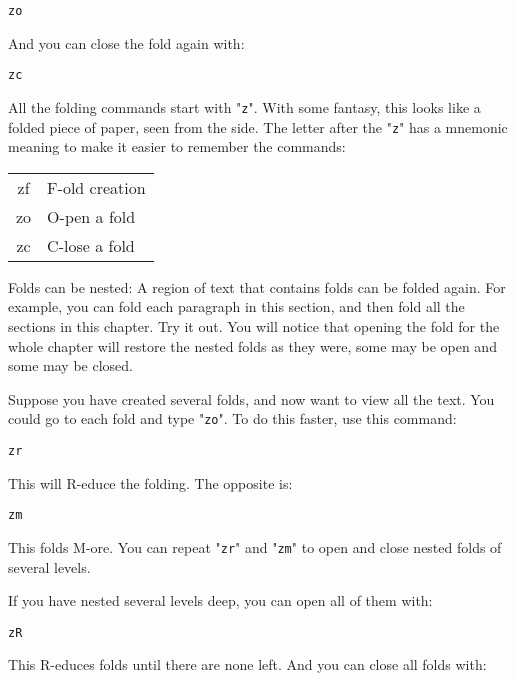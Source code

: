 \begin{Verbatim}[samepage=true]
 zo
\end{Verbatim}

And you can close the fold again with:

\begin{Verbatim}[samepage=true]
 zc
\end{Verbatim}

All the folding commands start with "\texttt{z}".
With some fantasy, this looks like a folded piece of paper, seen from the side.
The letter after the "\texttt{z}" has a mnemonic meaning to make it easier to remember the commands:
\begin{center} \begin{tabular}{c l}
				zf & F-old creation \\
				zo & O-pen a fold \\
				zc & C-lose a fold \\
\end{tabular} \end{center}

Folds can be nested: A region of text that contains folds can be folded again.
For example, you can fold each paragraph in this section, and then fold all the sections in this chapter.
Try it out.
You will notice that opening the fold for the whole chapter will restore the nested folds as they were, some may be open and some may be closed.

Suppose you have created several folds, and now want to view all the text.
You could go to each fold and type "\texttt{zo}".
To do this faster, use this command:

\begin{Verbatim}[samepage=true]
 zr
\end{Verbatim}

This will R-educe the folding.
The opposite is:

\begin{Verbatim}[samepage=true]
 zm
\end{Verbatim}

This folds M-ore.
You can repeat "\texttt{zr}" and "\texttt{zm}" to open and close nested folds of several levels.

If you have nested several levels deep, you can open all of them with:

\begin{Verbatim}[samepage=true]
 zR
\end{Verbatim}

This R-educes folds until there are none left.
And you can close all folds with:

